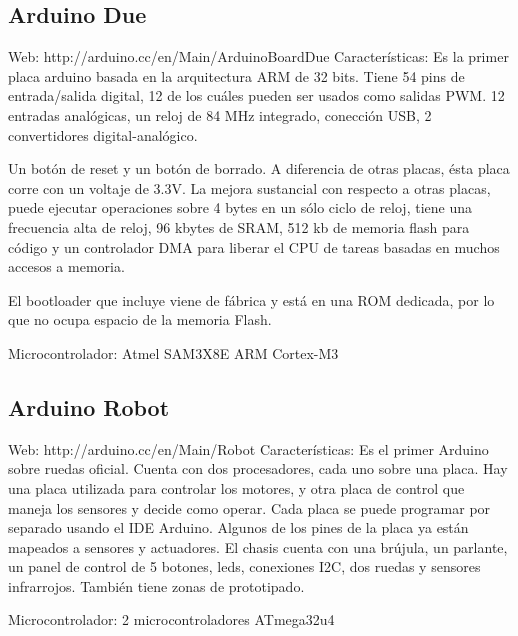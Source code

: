 \subsection{Arduino Due}
Web:
http://arduino.cc/en/Main/ArduinoBoardDue
Características:
Es la primer placa arduino basada en la arquitectura ARM de 32 bits.
Tiene 54 pins de entrada/salida digital, 12 de los cuáles pueden ser usados como salidas PWM.
12 entradas analógicas, un reloj de 84 MHz integrado, conección USB, 2 convertidores digital-analógico.

Un botón de reset y un botón de borrado.
A diferencia de otras placas, ésta placa corre con un voltaje de 3.3V.
La mejora sustancial con respecto a otras placas, puede ejecutar operaciones sobre 4 bytes en un sólo ciclo de reloj,
tiene una frecuencia alta de reloj, 96 kbytes de SRAM, 512 kb de memoria flash para código y
un controlador DMA para liberar el CPU de tareas basadas en muchos accesos a memoria.

El bootloader que incluye viene de fábrica y está en una ROM dedicada, por lo que no ocupa espacio de la memoria Flash.

Microcontrolador: Atmel SAM3X8E ARM Cortex-M3

\subsection{Arduino Robot}
Web:
http://arduino.cc/en/Main/Robot
Características:
Es el primer Arduino sobre ruedas oficial.
Cuenta con dos procesadores, cada uno sobre una placa.
Hay una placa utilizada para controlar los motores, y otra placa de control que maneja los
sensores y decide como operar.
Cada placa se puede programar por separado usando el IDE Arduino.
Algunos de los pines de la placa ya están mapeados a sensores y actuadores.
  El chasis cuenta con una brújula, un parlante, un panel de control de 5 botones, leds, conexiones I2C,
dos ruedas y sensores infrarrojos.
  También tiene zonas de prototipado.

Microcontrolador: 2 microcontroladores ATmega32u4
